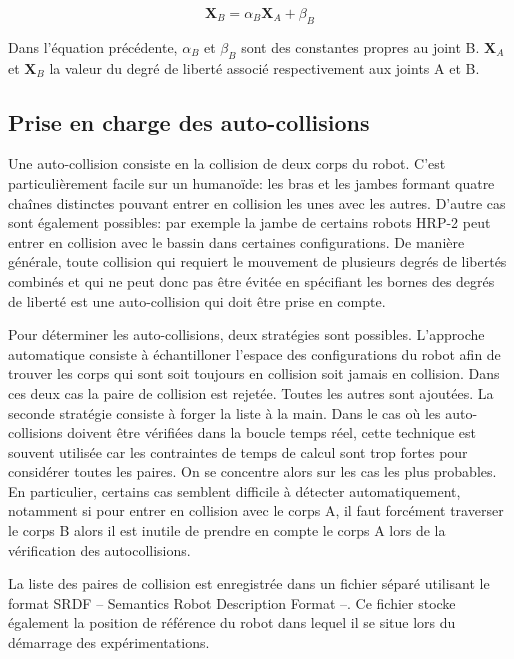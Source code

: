 \begin{equation}
  \mathbf{X}_B = \alpha_B \mathbf{X}_A + \beta_B
\end{equation}

Dans l'équation précédente, $\alpha_B$ et $\beta_B$ sont des
constantes propres au joint B. $\mathbf{X}_A$ et $\mathbf{X}_B$ la
valeur du degré de liberté associé respectivement aux joints A et B.


\subsection{Prise en charge des auto-collisions}

Une auto-collision consiste en la collision de deux corps du
robot. C'est particulièrement facile sur un humanoïde: les bras et les
jambes formant quatre chaînes distinctes pouvant entrer en collision
les unes avec les autres. D'autre cas sont également possibles: par
exemple la jambe de certains robots HRP-2 peut entrer en collision
avec le bassin dans certaines configurations. De manière générale,
toute collision qui requiert le mouvement de plusieurs degrés de
libertés combinés et qui ne peut donc pas être évitée en spécifiant
les bornes des degrés de liberté est une auto-collision qui doit être
prise en compte.

Pour déterminer les auto-collisions, deux stratégies sont
possibles. L'approche automatique consiste à échantilloner l'espace
des configurations du robot afin de trouver les corps qui sont soit
toujours en collision soit jamais en collision. Dans ces deux cas la
paire de collision est rejetée. Toutes les autres sont ajoutées.  La
seconde stratégie consiste à forger la liste à la main. Dans le cas où
les auto-collisions doivent être vérifiées dans la boucle temps réel,
cette technique est souvent utilisée car les contraintes de temps de
calcul sont trop fortes pour considérer toutes les paires. On se
concentre alors sur les cas les plus probables. En particulier,
certains cas semblent difficile à détecter automatiquement, notamment
si pour entrer en collision avec le corps A, il faut forcément
traverser le corps B alors il est inutile de prendre en compte le
corps A lors de la vérification des autocollisions.

La liste des paires de collision est enregistrée dans un fichier
séparé utilisant le format SRDF -- Semantics Robot Description Format
--. Ce fichier stocke également la position de référence du robot dans
lequel il se situe lors du démarrage des expérimentations.


